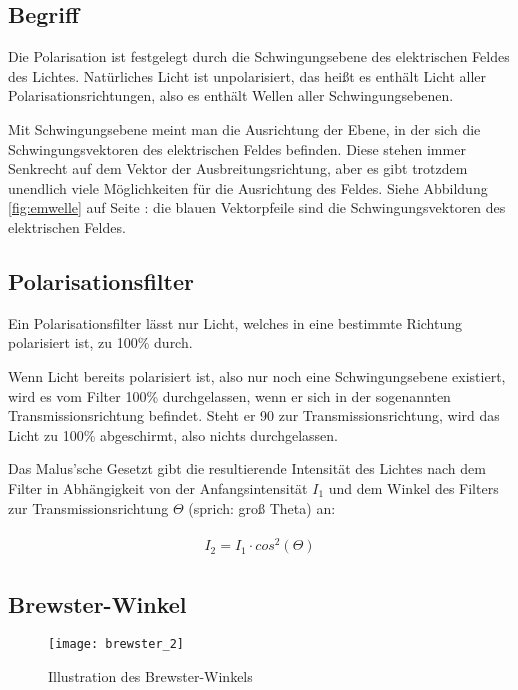 \subsection{Begriff}

Die Polarisation ist festgelegt durch die Schwingungsebene des elektrischen Feldes des Lichtes. Natürliches Licht ist unpolarisiert, das heißt es enthält Licht aller Polarisationsrichtungen, also es enthält Wellen aller Schwingungsebenen.

Mit Schwingungsebene meint man die Ausrichtung der Ebene, in der sich die Schwingungsvektoren des elektrischen Feldes befinden. Diese stehen immer Senkrecht auf dem Vektor der Ausbreitungsrichtung, aber es gibt trotzdem unendlich viele Möglichkeiten für die Ausrichtung des Feldes. Siehe Abbildung \ref{fig:emwelle} auf Seite \pageref{fig:emwelle}: die blauen Vektorpfeile sind die Schwingungsvektoren des elektrischen Feldes.

\subsection{Polarisationsfilter}

Ein Polarisationsfilter lässt nur Licht, welches in eine bestimmte Richtung polarisiert ist, zu 100\% durch. 

Wenn Licht bereits polarisiert ist, also nur noch eine Schwingungsebene existiert, wird es vom Filter 100\% durchgelassen, wenn er sich in der sogenannten Transmissionsrichtung befindet. Steht er 90\degree{} zur Transmissionsrichtung, wird das Licht zu 100\% abgeschirmt, also nichts durchgelassen.

Das Malus'sche Gesetzt gibt die resultierende Intensität des Lichtes nach dem Filter in Abhängigkeit von der Anfangsintensität $I_1$ und dem Winkel des Filters zur Transmissionsrichtung $\Theta$ (sprich: \glqq groß Theta\grqq ) an:

\begin{align}
\begin{split}
	I_2 = I_1 \cdot cos^2(\Theta)
\end{split}
\end{align}

\subsection{Brewster-Winkel}

\begin{figure}[!h]
	\centering
	\texttt{[image: brewster\_2]}
	\caption{Illustration des Brewster-Winkels}
	\label{fig:brewster}
\end{figure}

